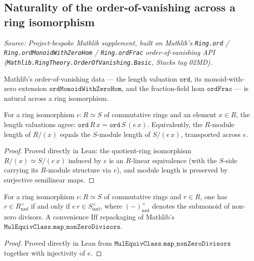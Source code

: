 \subsection{Naturality of the order-of-vanishing across a ring isomorphism}
\label{subsec:ordFrac_ringEquiv}
\textit{Source: Project-bespoke Mathlib supplement, built on Mathlib's
\texttt{Ring.ord} / \texttt{Ring.ordMonoidWithZeroHom} / \texttt{Ring.ordFrac}
order-of-vanishing API (\texttt{Mathlib.RingTheory.OrderOfVanishing.Basic},
Stacks tag 02MD).}

Mathlib's order-of-vanishing data --- the length valuation \(\texttt{ord}\), its
monoid-with-zero extension \(\texttt{ordMonoidWithZeroHom}\), and the
fraction-field hom \(\texttt{ordFrac}\) --- is natural across a ring
isomorphism.

\begin{lemma}

  \label{lem:ord_ringEquiv}
  For a ring isomorphism \(e \colon R \simeq S\) of commutative rings and an
  element \(x \in R\), the length valuations agree:
  \(\texttt{ord}\,R\,x = \texttt{ord}\,S\,(e\,x)\). Equivalently, the
  \(R\)-module length of \(R/(x)\) equals the \(S\)-module length of
  \(S/(e\,x)\), transported across \(e\).
\end{lemma}
\begin{proof}
  Proved directly in Lean: the quotient-ring isomorphism
  \(R/(x) \simeq S/(e\,x)\) induced by \(e\) is an \(R\)-linear equivalence
  (with the \(S\)-side carrying its \(R\)-module structure via \(e\)), and
  module length is preserved by surjective semilinear maps.
\end{proof}
\begin{lemma}

  \label{lem:nonZeroDivisors_ringEquiv}
  For a ring isomorphism \(e \colon R \simeq S\) of commutative rings and
  \(r \in R\), one has \(r \in R^{\times}_{\mathrm{nzd}}\) if and only if
  \(e\,r \in S^{\times}_{\mathrm{nzd}}\), where \((-)^{\times}_{\mathrm{nzd}}\)
  denotes the submonoid of non-zero divisors. A convenience \(\mathrm{Iff}\)
  repackaging of Mathlib's \(\texttt{MulEquivClass.map\_nonZeroDivisors}\).
\end{lemma}
\begin{proof}
  Proved directly in Lean from \(\texttt{MulEquivClass.map\_nonZeroDivisors}\)
  together with injectivity of \(e\).
\end{proof}
